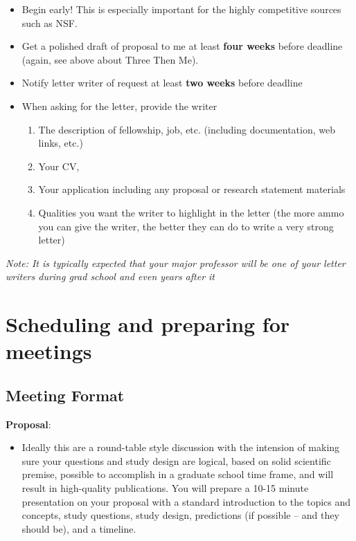 \documentclass[
]{article}
\providecommand{\tightlist}{%
  \setlength{\itemsep}{0pt}\setlength{\parskip}{0pt}}
\begin{document}
\begin{itemize}
\tightlist
\item
  Begin early! This is especially important for the highly competitive sources such as NSF.
\item
  Get a polished draft of proposal to me at least \textbf{four weeks} before deadline (again, see above about Three Then Me).
\item
  Notify letter writer of request at least \textbf{two weeks} before deadline
\item
  When asking for the letter, provide the writer

  \begin{enumerate}
  \def\labelenumi{\alph{enumi})}
  \tightlist
  \item
    The description of fellowship, job, etc. (including documentation, web links, etc.)
  \item
    Your CV,
  \item
    Your application including any proposal or research statement materials
  \item
    Qualities you want the writer to highlight in the letter (the more ammo you can give the writer, the better they can do to write a very strong letter)
  \end{enumerate}
\end{itemize}

\emph{Note: It is typically expected that your major professor will be one of your letter writers during grad school and even years after it}

\hypertarget{scheduling-and-preparing-for-meetings}{%
\section{\texorpdfstring{\textbf{Scheduling and preparing for meetings}}{Scheduling and preparing for meetings}}\label{scheduling-and-preparing-for-meetings}}

\hypertarget{meeting-format}{%
\subsection{Meeting Format}\label{meeting-format}}

\textbf{Proposal}:

\begin{itemize}
\tightlist
\item
  Ideally this are a round-table style discussion with the intension of making sure your questions and study design are logical, based on solid scientific premise, possible to accomplish in a graduate school time frame, and will result in high-quality publications. You will prepare a 10-15 minute presentation on your proposal with a standard introduction to the topics and concepts, study questions, study design, predictions (if possible -- and they should be), and a timeline.
\end{itemize}
\end{document}
